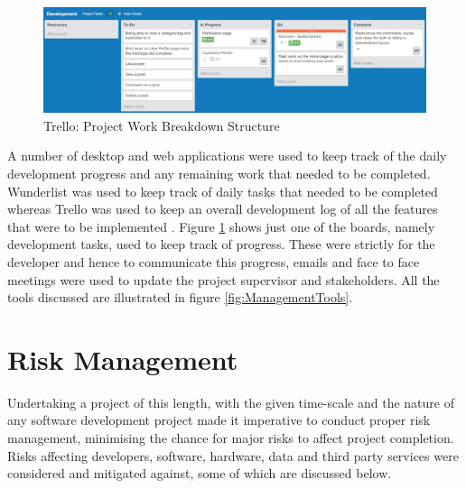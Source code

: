 \begin{figure}[H]
	\centering
	\includegraphics[width=1.0\textwidth]{Images/ProjectManagement/Trello}
	\caption{Trello: Project Work Breakdown Structure} \label{fig:Trello_WBS}
\end{figure}

A number of desktop and web applications were used to keep track of the daily development progress and any remaining work that needed to be completed. Wunderlist was used to keep track of daily tasks that needed to be completed whereas Trello was used to keep an overall development log of all the features that were to be implemented \cite{Wunderlist:Home, Trello:Home}. Figure \ref{fig:Trello_WBS} shows just one of the boards, namely development tasks, used to keep track of progress. These were strictly for the developer and hence to communicate this progress, emails and face to face meetings were used to update the project supervisor and stakeholders. All the tools discussed are illustrated in figure \ref{fig:ManagementTools}.

\section{Risk Management}
Undertaking a project of this length, with the given time-scale and the nature of any software development project made it imperative to conduct proper risk management, minimising the chance for major risks to affect project completion. Risks affecting developers, software, hardware, data and third party services were considered and mitigated against, some of which are discussed below.

